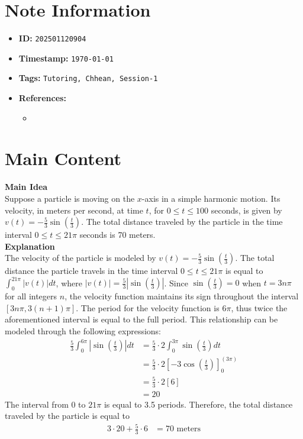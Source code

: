 \clearpage
{}
\label{202501120904}
\renewcommand{\notetitle}{Question 1}

\section*{Note Information}
\begin{itemize}
  \item \textbf{ID:} \texttt{202501120904}
  \item \textbf{Timestamp:} \texttt{\today \ \currenttime}
  \item \textbf{Tags:} \texttt{Tutoring, Chhean, Session-1}
  \item \textbf{References:}
    \begin{itemize}
      \item \href{}{}
    \end{itemize}
\end{itemize}


\section*{Main Content}
\textbf{Main Idea}\\
Suppose a particle is moving on the $x$-axis in a simple harmonic motion. Its velocity, in meters per second, at time $t$, for $0 \leq t \leq 100$ seconds, is given by $v(t) = -\frac{5}{3} \sin(\frac{t}{3})$.
The total distance traveled by the particle in the time interval $0 \leq t \leq 21 \pi$ seconds is 70 meters.\\

\textbf{Explanation}\\
The velocity of the particle is modeled by $v(t) = -\frac{5}{3} \sin (\frac{t}{3})$. 
The total distance the particle travels in the time interval $0 \leq t \leq 21 \pi$ is equal to $\int_{0}^{21 \pi} | v(t) | dt$, where $| v(t) | = \frac{5}{3} | \sin (\frac{t}{3}) |$. 
Since $\sin(\frac{t}{3}) = 0$ when $t = 3 n \pi$ for all integers $n$, the velocity function maintains its sign throughout the interval $[3 n \pi, 3(n+1) \pi]$. 
The period for the velocity function is $6 \pi$, thus twice the aforementioned interval is equal to the full period. 
This relationship can be modeled through the following expressions:
\begin{align*}
  \frac{5}{3} \int_0^{6\pi} | \sin (\frac{t}{3}) | dt &= \frac{5}{3} \cdot 2 \int_0^{3\pi} \sin (\frac{t}{3}) dt\\
                                                      &= \frac{5}{3} \cdot 2[-3 \cos(\frac{t}{3})]_0^(3\pi)\\
                                                      &= \frac{5}{3} \cdot 2[6]\\
                                                      &= 20
\end{align*}
The interval from 0 to $21 \pi$ is equal to 3.5 periods. Therefore, the total distance traveled by the particle is equal to
\begin{align*}
  3 \cdot 20 + \frac{5}{3} \cdot 6 &= 70 \text{ meters}
\end{align*}

